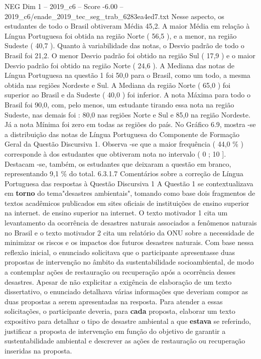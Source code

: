\begin{textsample}{NEG Dim 1 – 2019\_c6 – Score -6.00 – 2019\_c6/enade\_2019\_tec\_seg\_trab\_6283ea4ed7.txt}
Nesse aspecto, os estudantes de todo o Brasil obtiveram Média 45,2.
A maior Média em relação à Língua Portuguesa foi obtida na região Norte ( 56,5 ), e a menor, na região Sudeste ( 40,7 ).
Quanto à variabilidade das notas, o Desvio padrão de todo o Brasil foi 21,2.
O menor Desvio padrão foi obtido na região Sul ( 17,9 ) e o maior Desvio padrão foi obtido na região Norte ( 24,6 ).
A Mediana das notas de Língua Portuguesa na questão 1 foi 50,0 para o Brasil, como um todo, a mesma obtida nas regiões Nordeste e Sul.
A Mediana da região Norte ( 65,0 ) foi superior ao Brasil e da Sudeste ( 40,0 ) foi inferior.
A nota Máxima para todo o Brasil foi 90,0, com, pelo menos, um estudante tirando essa nota na região Sudeste, nas demais foi : 80,0 nas regiões Norte e Sul e 85,0 na região Nordeste.
Já a nota Mínima foi zero em todas as regiões do país.
No Gráfico 6.9, mostra -se a distribuição das notas de Língua Portuguesa do Componente de Formação Geral da Questão Discursiva 1.
Observa -se que a maior frequência ( 44,0 \% ) corresponde à dos estudantes que obtiveram nota no intervalo ( 0 ; 10 ].
Destacam -se, também, os estudantes que deixaram a questão em branco, representando 9,1 \% do total. 6.3.1.7 Comentários sobre a correção de Língua Portuguesa das respostas à Questão Discursiva 1 A Questão 1 se contextualizava em \textbf{torno} do tema"desastres ambientais", tomando como base dois fragmentos de textos acadêmicos publicados em sites oficiais de instituições de ensino superior na internet. de ensino superior na internet.
O texto motivador 1 cita um levantamento da ocorrência de desastres naturais associados a fenômenos naturais no Brasil e o texto motivador 2 cita um relatório da ONU sobre a necessidade de minimizar os riscos e os impactos dos futuros desastres naturais.
Com base nessa reflexão inicial, o enunciado solicitava que o participante apresentasse duas propostas de intervenção no âmbito da sustentabilidade socioambiental, de modo a contemplar ações de restauração ou recuperação após a ocorrência desses desastres.
Apesar de não explicitar a exigência de elaboração de um texto dissertativo, o enunciado detalhava várias informações que deveriam compor as duas propostas a serem apresentadas na resposta.
Para atender a essas solicitações, o participante deveria, para \textbf{cada} proposta, elaborar um texto expositivo para detalhar o tipo de desastre ambiental a que \textbf{estava} se referindo, justificar a proposta de intervenção em função do objetivo de garantir a sustentabilidade ambiental e descrever as ações de restauração ou recuperação inseridas na proposta.

\end{textsample}
